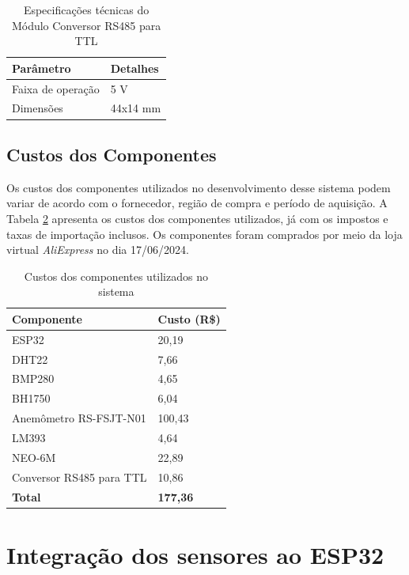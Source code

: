 \begin{table}[!htb]
  \caption{Especificações técnicas do Módulo Conversor RS485 para TTL}
  \begin{tabularx}{\textwidth}{|X|X|} \hline
      \textbf{Parâmetro} & \textbf{Detalhes} \\ \hline
      Faixa de operação & 5 V \\ \hline
      Dimensões & 44x14 mm \\ \hline
  \end{tabularx}
  \label{tab:rs485}
\end{table}

\subsection{Custos dos Componentes}

Os custos dos componentes utilizados no desenvolvimento desse sistema podem variar de acordo com o fornecedor, região de compra e período de aquisição. A Tabela \ref{tab:custos} apresenta os custos dos componentes utilizados, já com os impostos e taxas de importação inclusos. Os componentes foram comprados por meio da loja virtual \textit{AliExpress} no dia 17/06/2024.

\begin{table}[!htb]
  \caption{Custos dos componentes utilizados no sistema}
  \begin{tabularx}{\textwidth}{|X|X|} \hline
      \textbf{Componente} & \textbf{Custo (R\$)} \\ \hline
      ESP32 & 20,19 \\ \hline
      DHT22 & 7,66 \\ \hline
      BMP280 & 4,65 \\ \hline
      BH1750 & 6,04 \\ \hline
      Anemômetro RS-FSJT-N01 & 100,43 \\ \hline
      LM393 & 4,64 \\ \hline
      NEO-6M & 22,89 \\ \hline
      Conversor RS485 para TTL & 10,86 \\ \hline
      \textbf{Total} & \textbf{177,36} \\ \hline
  \end{tabularx}
  \label{tab:custos}
\end{table}


\section{Integração dos sensores ao ESP32}

